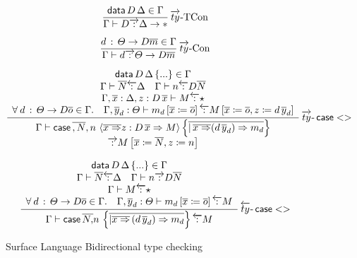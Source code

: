 \begin{figure}
\[
\frac{\mathsf{data}\,D\,\Delta\in\Gamma}{\Gamma\vdash D\overrightarrow{\,:\,}\Delta\rightarrow*}\operatorname{\overrightarrow{ty}-TCon}
\]

\[
\frac{d\,:\,\varTheta\rightarrow D\overline{m}\in\Gamma}{\Gamma\vdash d\overrightarrow{\,:\,}\varTheta\rightarrow D\overline{m}}\operatorname{\overrightarrow{ty}-Con}
\]

\[
\frac{\begin{array}{c}
\mathsf{data}\,D\,\Delta\left\{ ...\right\} \in\Gamma\\
\Gamma\vdash\overline{N}\overleftarrow{\,:\,}\Delta\quad\Gamma\vdash n\overleftarrow{\,:\,}D\overline{N}\\
\Gamma,\overline{x}:\Delta,z:D\,\overline{x}\vdash M\overleftarrow{\,:\,}\star\\
\forall\:d\,:\,\varTheta\rightarrow D\overline{o}\in\Gamma.\quad\Gamma,\overline{y}_{d}:\varTheta\vdash m_{d}\left[\overline{x}\coloneqq\overline{o}\right]\overleftarrow{\,:\,}M\left[\overline{x}\coloneqq\overline{o},z\coloneqq d\,\overline{y}_{d}\right]
\end{array}}{\begin{array}{c}
\Gamma\vdash\mathsf{case}\,\overline{,N},n\,\left\langle \overline{x\Rightarrow}z:D\,\overline{x}\Rightarrow M\right\rangle \left\{ \overline{|\,\overline{x\Rightarrow}(d\,\overline{y}_{d})\Rightarrow m_{d}}\right\} \\
\overrightarrow{\,:\,}M\left[\overline{x}\coloneqq\overline{N},z\coloneqq n\right]
\end{array}}\operatorname{\overrightarrow{ty}-}\mathsf{case}<>
\]

\[
\frac{\begin{array}{c}
\mathsf{data}\,D\,\Delta\left\{ ...\right\} \in\Gamma\\
\Gamma\vdash\overline{N}\overleftarrow{\,:\,}\Delta\quad\Gamma\vdash n\overrightarrow{\,:\,}D\overline{N}\\
\Gamma\vdash M\overleftarrow{\,:\,}\star\\
\forall\:d\,:\,\varTheta\rightarrow D\overline{o}\in\Gamma.\quad\Gamma,\overline{y}_{d}:\varTheta\vdash m_{d}\left[\overline{x}\coloneqq\overline{o}\right]\overleftarrow{\,:\,}M
\end{array}}{\Gamma\vdash\mathsf{case}\,\overline{N,}n\,\left\{ \overline{|\overline{x\Rightarrow}\,(d\,\overline{y}_{d})\Rightarrow m_{d}}\right\} \overleftarrow{\,:\,}M}\operatorname{\overleftarrow{ty}-}\mathsf{case}<>
\]


\caption{Surface Language Bidirectional type checking }
\label{fig:surface-data-bi-ty}
\end{figure}

